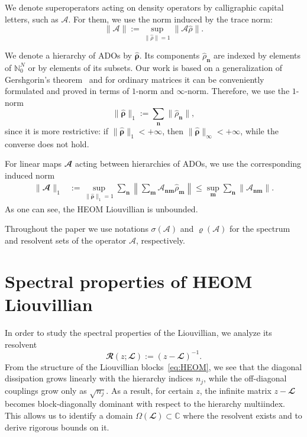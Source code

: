 \documentclass{SciPost}
\begin{document}
We denote superoperators acting on density operators by calligraphic capital letters, such as \(\mathcal A\). For them, we use the norm induced by the trace norm:
\begin{equation}
    \| \mathcal A \|
    :=
    \sup\limits_{\| \hat \rho \| = 1} \| \mathcal A \hat \rho\|.
\end{equation}

We denote a hierarchy of ADOs by \(\hat{\bm \rho}\). Its components \(\hat \rho_{\bm n}\) are indexed by elements of \(\mathbb N_0^N\) or by elements of its subsets. 
Our work is based on a generalization of Gershgorin's theorem~\cite{Gershgorin1931} and for ordinary matrices it can be conveniently formulated and proved in terms of $1$-norm and $\infty$-norm.
Therefore, we use the \(1\)-norm
\begin{equation}
    \| \hat{\bm \rho} \|_1
    :=
    \sum\limits_{\bm n} \| \hat \rho_{\bm n} \|,
\end{equation}
since it is more restrictive: if \(\|\hat {\bm \rho} \|_1 < +\infty\), then \(\| \hat{\bm \rho} \|_\infty < +\infty\), while the converse does not hold.

For linear maps \(\mathbfcal A\) acting between hierarchies of ADOs, we use the corresponding induced norm
\begin{align}
    \| \mathbfcal A \|_1
    &:=
    \sup \limits_{\| \hat {\bm \rho} \|_1 = 1}
    \sum_{\bm n} \left \| \sum\limits_{\bm m} \mathcal A_{\bm n \bm m} \hat \rho_{\bm m} \right \|
    \leqslant
    \sup_{\bm m} \sum\limits_{\bm n} \| \mathcal A_{\bm n \bm m} \|.
\end{align}
As one can see, the HEOM Liouvillian is unbounded.

Throughout the paper we use notations $\sigma(\mathcal A)$ and $\varrho(\mathcal A)$ for the spectrum and resolvent sets of the operator $\mathcal A$, respectively.

\section{Spectral properties of HEOM Liouvillian}

\label{sec:spectral}

In order to study the spectral properties of the Liouvillian, we analyze its resolvent
\begin{equation}
    \mathbfcal R(z;\mathbfcal L) := (z - \mathbfcal L)^{-1}.
\end{equation}
From the structure of the Liouvillian blocks~\eqref{eq:HEOM}, we see that the diagonal dissipation grows linearly with the hierarchy indices $n_j$, while the off-diagonal couplings grow only as $\sqrt{n_j}$. As a result, for certain \(z\), the infinite matrix \(z - \mathbfcal L\) becomes block-diagonally dominant with respect to the hierarchy multiindex. This allows us to identify a domain $\Omega(\mathbfcal L) \subset \mathbb C$ where the resolvent exists and to derive rigorous bounds on it.
\end{document}
